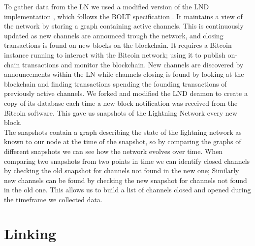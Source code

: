 To gather data from the LN we used a modified version of the LND implementation \cite{lnd}, which follows the BOLT specification \cite{bolt}. It maintains a view of the network by storing a graph containing active channels. This is continuously updated as new channels are announced trough the network, and closing transactions is found on new blocks on the blockchain. It requires a Bitcoin instance running to interact with the Bitcoin network; using it to publish on-chain transactions and monitor the blockchain. New channels are discovered by announcements within the LN while channels closing is found by looking at the blockchain and finding transactions spending the founding transactions of previously active channels. We forked and modified the LND deamon to create a copy of its database each time a new block notification was received from the Bitcoin software. This gave us snapshots of the Lightning Network every new block. 
\\

The snapshots contain a graph describing the state of the lightning network as known to our node at the time of the snapshot, so by comparing the graphs of different snapshots we can see how the network evolves over time. When comparing two snapshots from two points in time we can identify closed channels by checking the old snapshot for channels not found in the new one; Similarly new channels can be found by checking the new snapshot for channels not found in the old one. This allows us to build a list of channels closed and opened during the timeframe we collected data. 



\section{Linking}
\label{sec:linking}

